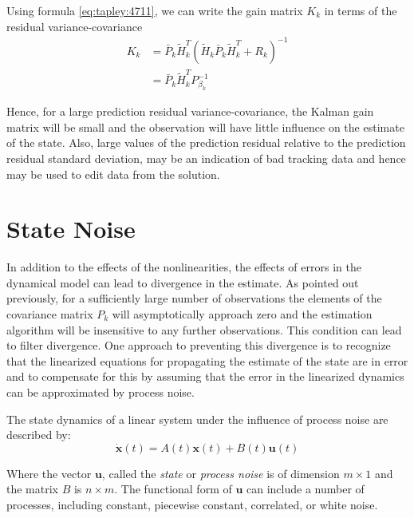 Using formula \ref{eq:tapley:4711}, we can write the gain matrix \(K_k\) in terms
of the residual variance-covariance
\begin{equation}
	\begin{aligned}
		K_k & =
		\bar{P}_k \tilde{H}^T_k \left( \tilde{H}_k \bar{P}_k \tilde{H}^T_k + R_k \right) ^{-1} \\
		    & =
		\bar{P}_k \tilde{H}^T_k P_{\beta _k}^{-1}
	\end{aligned}
\end{equation}

Hence, for a large prediction residual variance-covariance, the Kalman gain matrix
will be small and the observation will have little influence on the estimate of the
state. Also, large values of the prediction residual relative to the prediction residual
standard deviation, may be an indication of bad tracking data and hence may be used to
edit data from the solution.

\section{State Noise}
In addition to the effects of the nonlinearities, the effects of errors in the dynamical
model can lead to divergence in the estimate. As pointed out previously, for a sufficiently large
number of observations the elements of the covariance matrix \(P_k\) will asymptotically
approach zero and the estimation algorithm will be insensitive to any further
observations. This condition can lead to filter divergence. One approach to preventing
this divergence is to recognize that the linearized equations for propagating the
estimate of the state are in error and to compensate for this by assuming
that the error in the linearized dynamics can be approximated by process noise.

The state dynamics of a linear system under the influence of process noise are
described by:
\begin{equation}
	\label{eq:tapley491}
	\dot{\bm{x}} (t) = A(t) \bm{x} (t) + B (t) \bm{u} (t)
\end{equation}

Where the vector \(\bm{u}\), called the \emph{state} or \emph{process noise} is of
dimension \(m \times 1 \) and the matrix \(B\) is \(n \times m \).
The functional form of \(\bm{u}\) can include a number of processes, including constant,
piecewise constant, correlated, or white noise.

